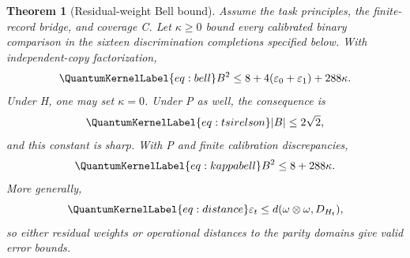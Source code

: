 \documentclass[a4paper,11pt,twocolumn,unpublished]{quantumarticle}
\let\label\QuantumKernelLabel
\newtheorem{theorem}{Theorem}
\newcommand{\eps}{\varepsilon}
\begin{document}
\begin{theorem}[Residual-weight Bell bound]\label{thm:bell}
Assume the task principles, the finite-record bridge, and coverage C. Let $\kappa\geq0$ bound every calibrated binary comparison in the sixteen discrimination completions specified below. With independent-copy factorization,
\begin{equation}\label{eq:bell}
 B^2\leq8+4(\eps_0+\eps_1)+288\kappa.
\end{equation}
Under H, one may set $\kappa=0$. Under P as well, the consequence is
\begin{equation}\label{eq:tsirelson}
 |B|\leq2\sqrt2,
\end{equation}
and this constant is sharp. With P and finite calibration discrepancies,
\begin{equation}\label{eq:kappabell}
 B^2\leq8+288\kappa.
\end{equation}
More generally,
\begin{equation}\label{eq:distance}
 \eps_t\leq d(\omega\otimes\omega,D_{H_t}),
\end{equation}
so either residual weights or operational distances to the parity domains give valid error bounds.
\end{theorem}
\end{document}
